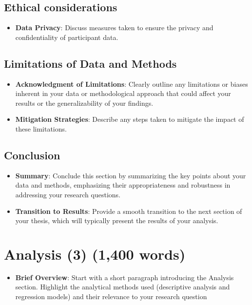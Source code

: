 \documentclass[
  12pt,
]{article}
\providecommand{\tightlist}{%
  \setlength{\itemsep}{0pt}\setlength{\parskip}{0pt}}\usepackage{longtable,booktabs,array}
\begin{document}
\subsection{Ethical considerations}\label{ethical-considerations}

\begin{itemize}
\tightlist
\item
  \textbf{Data Privacy}: Discuss measures taken to ensure the privacy
  and confidentiality of participant data.
\end{itemize}

\subsection{Limitations of Data and
Methods}\label{limitations-of-data-and-methods}

\begin{itemize}
\item
  \textbf{Acknowledgment of Limitations}: Clearly outline any
  limitations or biases inherent in your data or methodological approach
  that could affect your results or the generalizability of your
  findings.
\item
  \textbf{Mitigation Strategies}: Describe any steps taken to mitigate
  the impact of these limitations.
\end{itemize}

\subsection{Conclusion}\label{conclusion}

\begin{itemize}
\item
  \textbf{Summary}: Conclude this section by summarizing the key points
  about your data and methods, emphasizing their appropriateness and
  robustness in addressing your research questions.
\item
  \textbf{Transition to Results}: Provide a smooth transition to the
  next section of your thesis, which will typically present the results
  of your analysis.
\end{itemize}

\section{Analysis (3) (1,400 words)}\label{analysis-3-1400-words}

\begin{itemize}
\tightlist
\item
  \textbf{Brief Overview}: Start with a short paragraph introducing the
  Analysis section. Highlight the analytical methods used (descriptive
  analysis and regression models) and their relevance to your research
  question
\end{itemize}
\end{document}
